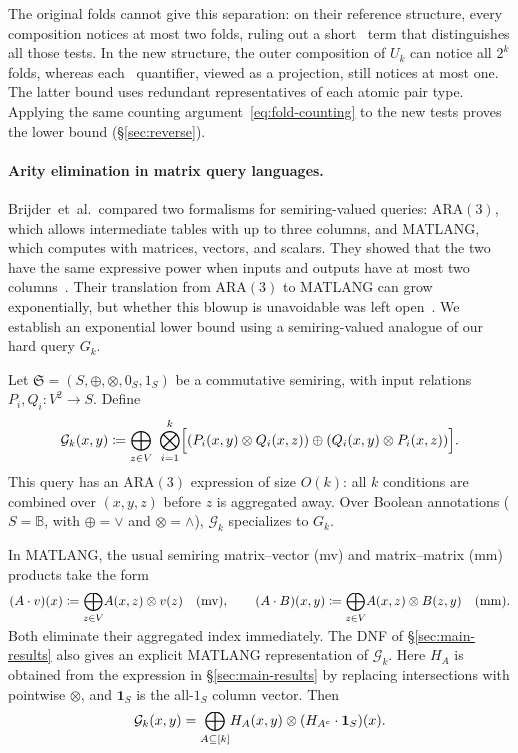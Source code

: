 The original folds cannot give this separation: on their reference
structure, every composition notices at most two folds, ruling out a
short \CoR\ term that distinguishes all those tests. In the new
structure, the outer composition of $U_k$ can notice all $2^k$ folds,
whereas each \FOtwo\ quantifier, viewed as a projection, still notices
at most one. The latter bound uses redundant representatives of each
atomic pair type. Applying the same counting argument~\eqref{eq:fold-counting}
to the new tests proves the lower bound (\S\ref{sec:reverse}).

\paragraph{Arity elimination in matrix query languages.}
Brijder~et~al.\ compared two formalisms for semiring-valued queries:
ARA$(3)$, which allows intermediate tables with up to three columns,
and MATLANG, which computes with matrices, vectors, and scalars.
They showed that the two have the same expressive power when inputs
and outputs have at most two columns~\cite{brijder2022}.
Their translation from ARA$(3)$ to MATLANG can grow exponentially,
but whether this blowup is unavoidable was left open~\citep[p.~9]{brijder2019}.
We establish an exponential lower bound using a semiring-valued
analogue of our hard query $G_k$.

Let $\mathfrak S=(S,\oplus,\otimes,0_S,1_S)$ be a commutative semiring,
with input relations $P_i,Q_i:V^2\to S$. Define
\[
  \mathcal G_k(x,y)\coloneqq
  \bigoplus_{z\in V}\ \bigotimes_{i=1}^k
  \Bigl[(P_i(x,y)\otimes Q_i(x,z))
  \oplus(Q_i(x,y)\otimes P_i(x,z))\Bigr].
\]
This query has an ARA$(3)$ expression of size $O(k)$: all $k$
conditions are combined over $(x,y,z)$ before $z$ is aggregated away.
Over Boolean annotations ($S=\mathbb B$, with $\oplus=\lor$ and
$\otimes=\land$), $\mathcal G_k$ specializes to $G_k$.

In MATLANG, the usual semiring matrix--vector (mv) and matrix--matrix
(mm) products take the form
\[
  (A \cdot v)(x) \coloneqq \smash{\bigoplus_{z\in V}} A(x,z)\otimes v(z)
  \quad\text{(mv)},\qquad
  (A \cdot B)(x,y) \coloneqq \smash{\bigoplus_{z\in V}} A(x,z)\otimes B(z,y)
  \quad\text{(mm)}.
\]

Both eliminate their aggregated index immediately.
The DNF of \S\ref{sec:main-results} also gives an explicit MATLANG
representation of $\mathcal G_k$. Here $H_A$ is obtained from the expression in \S\ref{sec:main-results}
by replacing intersections with pointwise $\otimes$, and
$\mathbf 1_S$ is the all-$1_S$ column vector. Then
\[
  \mathcal G_k(x,y)=\smash{\bigoplus_{A\subseteq[k]}}
       H_A(x,y)\otimes (H_{A^c}\cdot \mathbf{1}_S)(x).
\]

